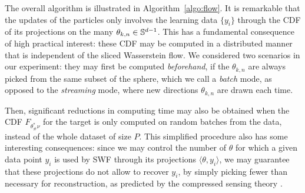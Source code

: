 The overall algorithm is illustrated in Algorithm~\ref{algo:flow}. It is remarkable that the updates of the particles only involves the learning data $\{y_i\}$ through the CDF of its projections on the many $\theta_{k,n}\in\mathbb{S}^{d-1}$. This has a fundamental consequence of high practical interest: these CDF may be computed in a distributed manner that is independent of the sliced Wasserstein flow. We considered two scenarios in our experiment: they may first be computed \textit{beforehand}, if the $\theta_{k,n}$ are always picked from the same subset of the sphere, which we call a \textit{batch} mode, as opposed to the \textit{streaming} mode, where new directions $\theta_{k,n}$ are drawn each time.

Then, significant reductions in computing time may also be obtained when the CDF $F_{\theta^*_\#\nu}$ for the target is only computed on random batches from the data, instead of the whole dataset of size $P$. This simplified procedure also has some interesting consequences: since we may control the number of $\theta$ for which a given data point $y_i$ is used by SWF through its projections $\langle\theta,y_i\rangle$, we may guarantee that these projections do not allow to recover $y_i$, by simply picking fewer than necessary for reconstruction, as predicted by the compressed sensing theory \cite{donoho2009observed}.
